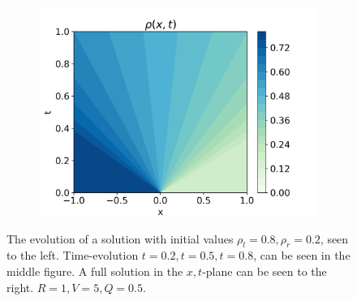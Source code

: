 \documentclass[10pt]{article}
\numberwithin{equation}{section}
\begin{document}
\begin{figure}
\begin{subfigure}[b]{0.3\textwidth}
     \end{subfigure}
     \hfill
     \begin{subfigure}[b]{0.3\textwidth}
         \centering
         \includegraphics[width=\textwidth]{Figures/Model/Plots/RarefactionFull.png}
     \end{subfigure}
        \caption{The evolution of a solution with initial values $\rho_l = 0.8, \rho_r = 0.2$, seen to the left. Time-evolution $t = 0.2, t = 0.5, t = 0.8$, can be seen in the middle figure. A full solution in the $x,t$-plane can be seen to the right. $R=1, V = 5, Q = 0.5$.}
        \label{fig:ExampleRarefaction}
\end{figure}
\end{document}
